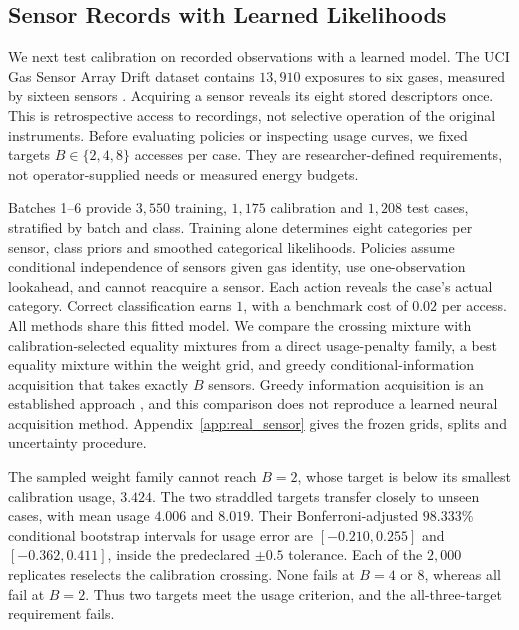 \documentclass[runningheads]{llncs}
\begin{document}
\subsection{Sensor Records with Learned Likelihoods}
\label{sec:real_sensor}

We next test calibration on recorded observations with a learned model. The UCI Gas Sensor Array Drift dataset contains $13{,}910$ exposures to six gases, measured by sixteen sensors \citep{vergara2012data,vergara2012}. Acquiring a sensor reveals its eight stored descriptors once. This is retrospective access to recordings, not selective operation of the original instruments. Before evaluating policies or inspecting usage curves, we fixed targets $B\in\{2,4,8\}$ accesses per case. They are researcher-defined requirements, not operator-supplied needs or measured energy budgets.

Batches 1--6 provide $3{,}550$ training, $1{,}175$ calibration and $1{,}208$ test cases, stratified by batch and class. Training alone determines eight categories per sensor, class priors and smoothed categorical likelihoods. Policies assume conditional independence of sensors given gas identity, use one-observation lookahead, and cannot reacquire a sensor. Each action reveals the case's actual category. Correct classification earns $1$, with a benchmark cost of $0.02$ per access. All methods share this fitted model. We compare the crossing mixture with calibration-selected equality mixtures from a direct usage-penalty family, a best equality mixture within the weight grid, and greedy conditional-information acquisition that takes exactly $B$ sensors. Greedy information acquisition is an established approach \citep{covert2023}, and this comparison does not reproduce a learned neural acquisition method. Appendix~\ref{app:real_sensor} gives the frozen grids, splits and uncertainty procedure.

The sampled weight family cannot reach $B=2$, whose target is below its smallest calibration usage, $3.424$. The two straddled targets transfer closely to unseen cases, with mean usage $4.006$ and $8.019$. Their Bonferroni-adjusted $98.333\%$ conditional bootstrap intervals for usage error are $[-0.210,0.255]$ and $[-0.362,0.411]$, inside the predeclared $\pm0.5$ tolerance. Each of the $2{,}000$ replicates reselects the calibration crossing. None fails at $B=4$ or $8$, whereas all fail at $B=2$. Thus two targets meet the usage criterion, and the all-three-target requirement fails.
\end{document}
